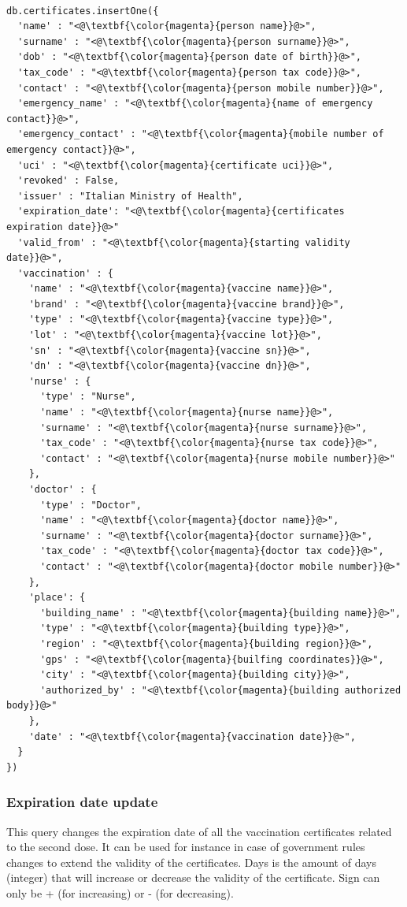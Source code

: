 \documentclass{article}
\begin{document}
\begin{lstlisting}[language=cypher, label=lst:cypher-example]

db.certificates.insertOne({
  'name' : "<@\textbf{\color{magenta}{person name}}@>",
  'surname' : "<@\textbf{\color{magenta}{person surname}}@>",
  'dob' : "<@\textbf{\color{magenta}{person date of birth}}@>",
  'tax_code' : "<@\textbf{\color{magenta}{person tax code}}@>",
  'contact' : "<@\textbf{\color{magenta}{person mobile number}}@>",
  'emergency_name' : "<@\textbf{\color{magenta}{name of emergency contact}}@>",
  'emergency_contact' : "<@\textbf{\color{magenta}{mobile number of emergency contact}}@>",
  'uci' : "<@\textbf{\color{magenta}{certificate uci}}@>",
  'revoked' : False,
  'issuer' : "Italian Ministry of Health",
  'expiration_date': "<@\textbf{\color{magenta}{certificates expiration date}}@>"
  'valid_from' : "<@\textbf{\color{magenta}{starting validity date}}@>",
  'vaccination' : {
    'name' : "<@\textbf{\color{magenta}{vaccine name}}@>",
    'brand' : "<@\textbf{\color{magenta}{vaccine brand}}@>",
    'type' : "<@\textbf{\color{magenta}{vaccine type}}@>",
    'lot' : "<@\textbf{\color{magenta}{vaccine lot}}@>",
    'sn' : "<@\textbf{\color{magenta}{vaccine sn}}@>",
    'dn' : "<@\textbf{\color{magenta}{vaccine dn}}@>",
    'nurse' : {
      'type' : "Nurse",
      'name' : "<@\textbf{\color{magenta}{nurse name}}@>",
      'surname' : "<@\textbf{\color{magenta}{nurse surname}}@>",
      'tax_code' : "<@\textbf{\color{magenta}{nurse tax code}}@>",
      'contact' : "<@\textbf{\color{magenta}{nurse mobile number}}@>"
    },
    'doctor' : {
      'type' : "Doctor",
      'name' : "<@\textbf{\color{magenta}{doctor name}}@>",
      'surname' : "<@\textbf{\color{magenta}{doctor surname}}@>",
      'tax_code' : "<@\textbf{\color{magenta}{doctor tax code}}@>",
      'contact' : "<@\textbf{\color{magenta}{doctor mobile number}}@>"
    },
    'place': {
      'building_name' : "<@\textbf{\color{magenta}{building name}}@>",
      'type' : "<@\textbf{\color{magenta}{building type}}@>",
      'region' : "<@\textbf{\color{magenta}{building region}}@>",
      'gps' : "<@\textbf{\color{magenta}{builfing coordinates}}@>",
      'city' : "<@\textbf{\color{magenta}{building city}}@>",
      'authorized_by' : "<@\textbf{\color{magenta}{building authorized body}}@>"
    },
    'date' : "<@\textbf{\color{magenta}{vaccination date}}@>",
  }
})

\end{lstlisting}
\subsubsection{Expiration date update}
This query changes the expiration date of all the vaccination certificates related to the second dose. It can be used for instance in case of government rules changes to extend the validity of the certificates.
Days is the amount of days (integer) that will increase or decrease the validity of the certificate. Sign can only be + (for increasing) or - (for decreasing).
\end{document}
